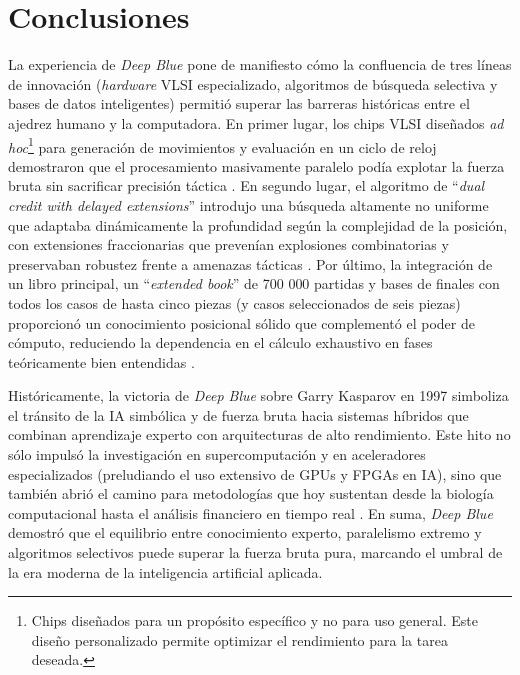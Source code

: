 \documentclass[a4paper, 12pt]{article}
\begin{document}
\newpage
\section{Conclusiones}


La experiencia de \textit{Deep Blue} pone de manifiesto cómo la 
confluencia de tres líneas de innovación (\emph{hardware} VLSI 
especializado, algoritmos de búsqueda selectiva y bases de datos 
inteligentes) permitió superar las barreras históricas entre el 
ajedrez humano y la computadora. En primer lugar, los chips 
VLSI diseñados \emph{ad hoc}\footnote{Chips diseñados para un propósito específico y no para uso general. Este diseño personalizado permite optimizar el rendimiento para la tarea deseada.} 
para generación de movimientos y 
evaluación en un ciclo de reloj demostraron que el procesamiento 
masivamente paralelo podía explotar la fuerza bruta sin 
sacrificar precisión táctica \cite{campbell2002deep}. 
En segundo lugar, el algoritmo de “\emph{dual credit with delayed 
extensions}” introdujo una búsqueda altamente no uniforme que 
adaptaba dinámicamente la profundidad según la complejidad de 
la posición, con extensiones fraccionarias que prevenían 
explosiones combinatorias y preservaban robustez frente a 
amenazas tácticas \cite{aung2010}. Por último, la 
integración de un libro principal, un “\emph{extended book}” de 700 000 
partidas y bases de finales con todos los casos de hasta cinco 
piezas (y casos seleccionados de seis piezas) proporcionó un conocimiento posicional sólido que 
complementó el poder de cómputo, reduciendo la dependencia en 
el cálculo exhaustivo en fases teóricamente bien entendidas 
\cite{greenemeier2017}.

Históricamente, la victoria de \textit{Deep Blue} sobre Garry 
Kasparov en 1997 simboliza el tránsito de la IA simbólica y de 
fuerza bruta hacia sistemas híbridos que combinan aprendizaje 
experto con arquitecturas de alto rendimiento. 
Este hito no sólo impulsó la investigación en supercomputación y 
en aceleradores especializados (preludiando el uso extensivo de 
GPUs y FPGAs en IA), sino que también abrió el camino para metodologías 
que hoy sustentan desde la biología computacional hasta el 
análisis financiero en tiempo real \cite{wired2017ai}. 
En suma, \textit{Deep Blue} demostró que el equilibrio entre 
conocimiento experto, paralelismo extremo y algoritmos 
selectivos puede superar la fuerza bruta pura, marcando el 
umbral de la era moderna de la inteligencia artificial aplicada.



\newpage

\end{document}
